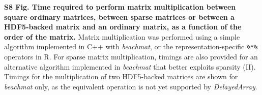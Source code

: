\documentclass[10pt,letterpaper]{article}
\newcommand{\beachmat}{\textit{beachmat}}
\newcommand{\code}[1]{\texttt{#1}}
\begin{document}
\noindent
\textbf{S8 Fig. Time required to perform matrix multiplication between square ordinary matrices, between sparse matrices or between a HDF5-backed matrix and an ordinary matrix,
as a function of the order of the matrix.}    
Matrix multiplication was performed using a simple algorithm implemented in C++ with \beachmat{}, or the representation-specific \code{\%*\%} operators in R.
For sparse matrix multiplication, timings are also provided for an alternative algorithm implemented in \beachmat{} that better exploits sparsity (II). 
Timings for the multiplication of two HDF5-backed matrices are shown for \beachmat{} only, as the equivalent operation is not yet supported by \textit{DelayedArray}.
\end{document}
